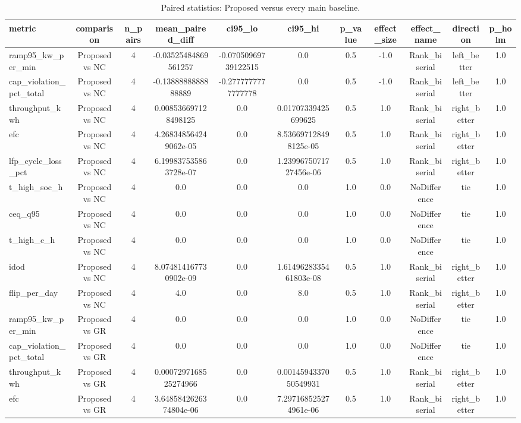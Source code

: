 \begin{table}[t]
\centering
\caption{Paired statistics: Proposed versus every main baseline.}
\label{tab:stats_all_auto}
\begin{tabular}{lcccccccccc}
\toprule
metric & comparison & n\_pairs & mean\_paired\_diff & ci95\_lo & ci95\_hi & p\_value & effect\_size & effect\_name & direction & p\_holm \\
\midrule
ramp95\_kw\_per\_min & Proposed vs NC & 4 & -0.03525484869561257 & -0.07050969739122515 & 0.0 & 0.5 & -1.0 & Rank\_biserial & left\_better & 1.0 \\
cap\_violation\_pct\_total & Proposed vs NC & 4 & -0.1388888888888889 & -0.2777777777777778 & 0.0 & 0.5 & -1.0 & Rank\_biserial & left\_better & 1.0 \\
throughput\_kwh & Proposed vs NC & 4 & 0.008536697128498125 & 0.0 & 0.01707339425699625 & 0.5 & 1.0 & Rank\_biserial & right\_better & 1.0 \\
efc & Proposed vs NC & 4 & 4.268348564249062e-05 & 0.0 & 8.536697128498125e-05 & 0.5 & 1.0 & Rank\_biserial & right\_better & 1.0 \\
lfp\_cycle\_loss\_pct & Proposed vs NC & 4 & 6.199837535863728e-07 & 0.0 & 1.2399675071727456e-06 & 0.5 & 1.0 & Rank\_biserial & right\_better & 1.0 \\
t\_high\_soc\_h & Proposed vs NC & 4 & 0.0 & 0.0 & 0.0 & 1.0 & 0.0 & NoDifference & tie & 1.0 \\
ceq\_q95 & Proposed vs NC & 4 & 0.0 & 0.0 & 0.0 & 1.0 & 0.0 & NoDifference & tie & 1.0 \\
t\_high\_c\_h & Proposed vs NC & 4 & 0.0 & 0.0 & 0.0 & 1.0 & 0.0 & NoDifference & tie & 1.0 \\
idod & Proposed vs NC & 4 & 8.074814167730902e-09 & 0.0 & 1.6149628335461803e-08 & 0.5 & 1.0 & Rank\_biserial & right\_better & 1.0 \\
flip\_per\_day & Proposed vs NC & 4 & 4.0 & 0.0 & 8.0 & 0.5 & 1.0 & Rank\_biserial & right\_better & 1.0 \\
ramp95\_kw\_per\_min & Proposed vs GR & 4 & 0.0 & 0.0 & 0.0 & 1.0 & 0.0 & NoDifference & tie & 1.0 \\
cap\_violation\_pct\_total & Proposed vs GR & 4 & 0.0 & 0.0 & 0.0 & 1.0 & 0.0 & NoDifference & tie & 1.0 \\
throughput\_kwh & Proposed vs GR & 4 & 0.0007297168525274966 & 0.0 & 0.0014594337050549931 & 0.5 & 1.0 & Rank\_biserial & right\_better & 1.0 \\
efc & Proposed vs GR & 4 & 3.6485842626374804e-06 & 0.0 & 7.297168525274961e-06 & 0.5 & 1.0 & Rank\_biserial & right\_better & 1.0 \\

\end{tabular}
\end{table}
